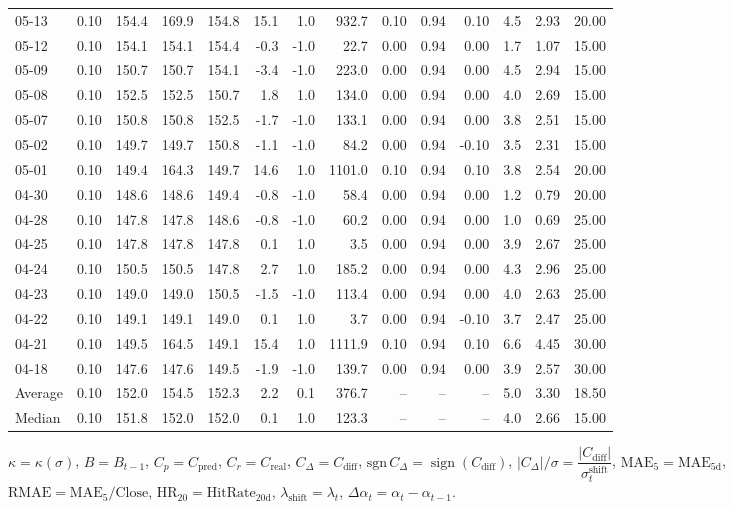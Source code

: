 \begin{threeparttable}
{\begin{tabular}{lrrrrrrrrrrrrr}
05-13 & 0.10 & 154.4 & 169.9 & 154.8 & 15.1 & 1.0 & 932.7 & 0.10 & 0.94 & 0.10 & 4.5 & 2.93 & 20.00 \\
05-12 & 0.10 & 154.1 & 154.1 & 154.4 & -0.3 & -1.0 & 22.7 & 0.00 & 0.94 & 0.00 & 1.7 & 1.07 & 15.00 \\
05-09 & 0.10 & 150.7 & 150.7 & 154.1 & -3.4 & -1.0 & 223.0 & 0.00 & 0.94 & 0.00 & 4.5 & 2.94 & 15.00 \\
05-08 & 0.10 & 152.5 & 152.5 & 150.7 & 1.8 & 1.0 & 134.0 & 0.00 & 0.94 & 0.00 & 4.0 & 2.69 & 15.00 \\
05-07 & 0.10 & 150.8 & 150.8 & 152.5 & -1.7 & -1.0 & 133.1 & 0.00 & 0.94 & 0.00 & 3.8 & 2.51 & 15.00 \\
05-02 & 0.10 & 149.7 & 149.7 & 150.8 & -1.1 & -1.0 & 84.2 & 0.00 & 0.94 & -0.10 & 3.5 & 2.31 & 15.00 \\
05-01 & 0.10 & 149.4 & 164.3 & 149.7 & 14.6 & 1.0 & 1101.0 & 0.10 & 0.94 & 0.10 & 3.8 & 2.54 & 20.00 \\
04-30 & 0.10 & 148.6 & 148.6 & 149.4 & -0.8 & -1.0 & 58.4 & 0.00 & 0.94 & 0.00 & 1.2 & 0.79 & 20.00 \\
04-28 & 0.10 & 147.8 & 147.8 & 148.6 & -0.8 & -1.0 & 60.2 & 0.00 & 0.94 & 0.00 & 1.0 & 0.69 & 25.00 \\
04-25 & 0.10 & 147.8 & 147.8 & 147.8 & 0.1 & 1.0 & 3.5 & 0.00 & 0.94 & 0.00 & 3.9 & 2.67 & 25.00 \\
04-24 & 0.10 & 150.5 & 150.5 & 147.8 & 2.7 & 1.0 & 185.2 & 0.00 & 0.94 & 0.00 & 4.3 & 2.96 & 25.00 \\
04-23 & 0.10 & 149.0 & 149.0 & 150.5 & -1.5 & -1.0 & 113.4 & 0.00 & 0.94 & 0.00 & 4.0 & 2.63 & 25.00 \\
04-22 & 0.10 & 149.1 & 149.1 & 149.0 & 0.1 & 1.0 & 3.7 & 0.00 & 0.94 & -0.10 & 3.7 & 2.47 & 25.00 \\
04-21 & 0.10 & 149.5 & 164.5 & 149.1 & 15.4 & 1.0 & 1111.9 & 0.10 & 0.94 & 0.10 & 6.6 & 4.45 & 30.00 \\
04-18 & 0.10 & 147.6 & 147.6 & 149.5 & -1.9 & -1.0 & 139.7 & 0.00 & 0.94 & 0.00 & 3.9 & 2.57 & 30.00 \\
Average & 0.10 & 152.0 & 154.5 & 152.3 & 2.2 & 0.1 & 376.7 & -- & -- & -- & 5.0 & 3.30 & 18.50 \\
Median & 0.10 & 151.8 & 152.0 & 152.0 & 0.1 & 1.0 & 123.3 & -- & -- & -- & 4.0 & 2.66 & 15.00 \\
\bottomrule
\end{tabular}
}%
\begin{tablenotes}\footnotesize
\item $\kappa=\kappa(\sigma)$, $B=B_{t-1}$, $C_p=C_{\text{pred}}$, $C_r=C_{\text{real}}$, $C_\Delta=C_{\text{diff}}$, $\mathrm{sgn}\,C_\Delta=\operatorname{sign}(C_{\text{diff}})$, $|C_\Delta|/\sigma=\dfrac{|C_{\text{diff}}|}{\sigma_t^{\text{shift}}}$, $\mathrm{MAE}_5=\mathrm{MAE}_{5\text{d}}$, $\mathrm{RMAE}= \mathrm{MAE}_5 / \text{Close}$, $\mathrm{HR}_{20}=\mathrm{HitRate}_{20\text{d}}$, 
$\lambda_{\text{shift}}=\lambda_t$, 
$\Delta\alpha_t=\alpha_t-\alpha_{t-1}$.
\end{tablenotes}
\end{threeparttable}
\endgroup
